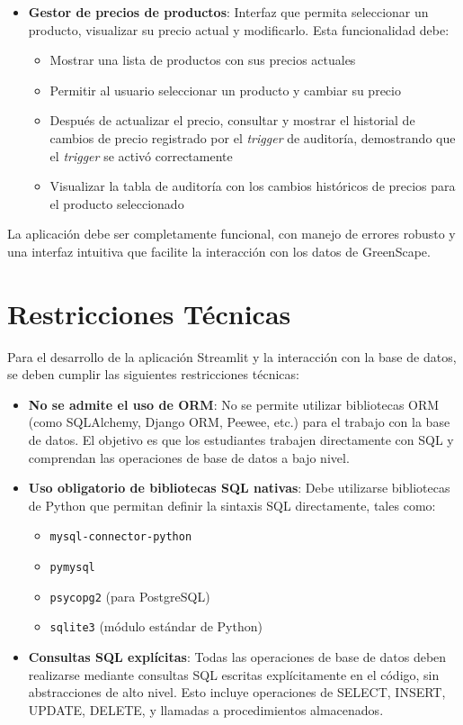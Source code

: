 \documentclass[10pt]{article}
\begin{document}
\begin{enumerate}
\begin{itemize}
			\item \textbf{Gestor de precios de productos}: Interfaz que permita seleccionar un producto, visualizar su precio actual y modificarlo. Esta funcionalidad debe:
			\begin{itemize}
				\item Mostrar una lista de productos con sus precios actuales
				\item Permitir al usuario seleccionar un producto y cambiar su precio
				\item Después de actualizar el precio, consultar y mostrar el historial de cambios de precio registrado por el \emph{trigger} de auditoría, demostrando que el \emph{trigger} se activó correctamente
				\item Visualizar la tabla de auditoría con los cambios históricos de precios para el producto seleccionado
			\end{itemize}
		\end{itemize}

		La aplicación debe ser completamente funcional, con manejo de errores robusto y una interfaz intuitiva que facilite la interacción con los datos de GreenScape.

	\end{enumerate}

	\section*{Restricciones Técnicas}

	Para el desarrollo de la aplicación Streamlit y la interacción con la base de datos, se deben cumplir las siguientes restricciones técnicas:

	\begin{itemize}
		\item \textbf{No se admite el uso de ORM}: No se permite utilizar bibliotecas ORM (como SQLAlchemy, Django ORM, Peewee, etc.) para el trabajo con la base de datos. El objetivo es que los estudiantes trabajen directamente con SQL y comprendan las operaciones de base de datos a bajo nivel.

		\item \textbf{Uso obligatorio de bibliotecas SQL nativas}: Debe utilizarse bibliotecas de Python que permitan definir la sintaxis SQL directamente, tales como:
		\begin{itemize}
			\item \texttt{mysql-connector-python}
			\item \texttt{pymysql}
			\item \texttt{psycopg2} (para PostgreSQL)
			\item \texttt{sqlite3} (módulo estándar de Python)
		\end{itemize}

		\item \textbf{Consultas SQL explícitas}: Todas las operaciones de base de datos deben realizarse mediante consultas SQL escritas explícitamente en el código, sin abstracciones de alto nivel. Esto incluye operaciones de SELECT, INSERT, UPDATE, DELETE, y llamadas a procedimientos almacenados.

	\end{itemize}
\end{document}
